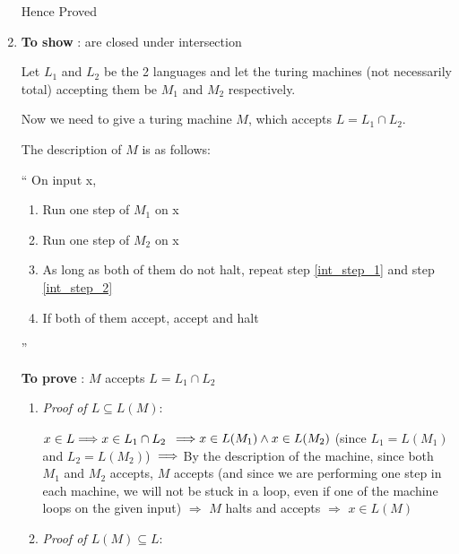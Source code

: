 \begin{enumerate}
\begin{enumerate}
    \end{enumerate}
    
Hence Proved

\item \textbf{To show} : \re are closed under intersection
    
    Let $L_1$ and $L_2$ be the 2 \re languages and let the turing machines (not necessarily total) accepting them be $M_1$ and $M_2$ respectively.

    Now we need to give a turing machine $M$, which accepts $ L = L_1 \cap L_2 $.

    The description of $M$ is as follows:

    ``
        On input x,
        \begin{enumerate}
            \item \label{int_step_1} Run one step of $M_1$ on x
            \item \label{int_step_2} Run one step of $M_2$ on x
            \item \label{int_step_3} As long as both of them do not halt, repeat step \ref{int_step_1} and step \ref{int_step_2}
            \item \label{int_step_4} If both of them accept, accept and halt
        \end{enumerate}
    ''

    \textbf{To prove} : $M$ accepts $L = L_1 \cap L_2$

    \begin{enumerate}
    \item \textit{Proof of $L \subseteq L(M)$}:
            
$ 
x \in L 
\newline
\Longrightarrow 
x \in L_1 \cap L_2
$
$
\newline
\Longrightarrow
x \in L(M_1) \land x \in L(M_2)$
(since $L_1 = L(M_1)$ and $L_2 = L(M_2)$)
$
\newline
\Longrightarrow
$
By the description of the machine, since both $M_1$ and $M_2$ accepts, $M$ accepts (and since we are performing one step in each machine, we will not be stuck in a loop, even if one of the machine loops on the given input)
\newline
$\Longrightarrow$
$M$ halts and accepts
\newline
$\Longrightarrow$
$ x \in L(M)$


\item \textit{Proof of $L(M) \subseteq L$}:


\end{enumerate}
\end{enumerate}
